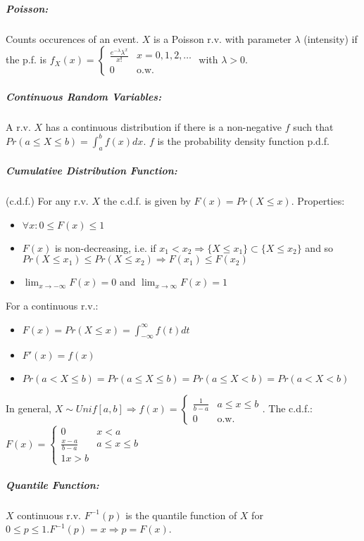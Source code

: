 \documentclass[landscape,10pt]{article}
\begin{document}
\begin{multicols}{3}
            \subparagraph*{Poisson: }
                    Counts occurences of an event. $X$ is a Poisson r.v. with parameter $\lambda$ (intensity) if the p.f. is $f_X(x) = \begin{cases} \frac{e^{-\lambda}\lambda^x}{x!} & x=0,1,2,\ldots \\ 0 & \text{o.w.} \end{cases}$ with $\lambda>0$.
            \subparagraph*{Continuous Random Variables: }
                    A r.v. $X$ has a continuous distribution if there is a non-negative $f$ such that $Pr(a \leq X \leq b) = \int_{a}^{b} f(x)dx$. $f$ is the probability density function p.d.f. 
            \subparagraph*{Cumulative Distribution Function: } 
                    (c.d.f.) For any r.v. $X$ the c.d.f. is given by $F(x) = Pr(X \leq x)$. Properties: \begin{itemize}
                        \item[] $\forall x: 0 \leq F(x) \leq 1$
                        \item[] $F(x)$ is non-decreasing, i.e. if $x_1 < x_2 \Rightarrow \{X \leq x_1 \} \subset \{X \leq x_2 \}$ and so $Pr(X \leq x_1) \leq Pr(X \leq x_2) \Rightarrow F(x_1) \leq F(x_2)$
                        \item[] $\lim_{x \to -\infty} F(x) = 0$ and $\lim_{x \to \infty} F(x) = 1$
                    \end{itemize}
                    For a continuous r.v.:
                    \begin{itemize}
                        \item[] $F(x) = Pr(X \leq x) = \int_{-\infty}^{\infty}f(t)dt$
                        \item[] $F'(x) = f(x)$
                        \item[] $Pr(a < X \leq b) = Pr(a \leq X \leq b) = Pr(a \leq X < b) = Pr(a < X < b)$
                    \end{itemize}
                In general, $X \sim Unif[a,b] \Rightarrow f(x) = \begin{cases} \frac{1}{b-a} & a \leq x \leq b \\ 0 & \text{o.w.} \end{cases}$. The c.d.f.: $F(x) = \begin{cases} 0 & x < a \\ \frac{x-a}{b-a} & a \leq x \leq b \\ 1 x > b \end{cases}$
                    \subparagraph*{Quantile Function: }
                        $X$ continuous r.v. $F^{-1}(p)$ is the quantile function of $X$ for $0 \leq p \leq 1. F^{-1}(p) = x \Rightarrow p = F(x)$.


\end{multicols}
\end{document}
